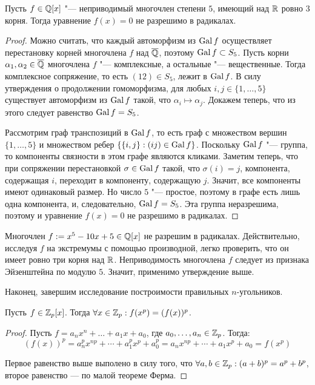 \begin{corollary}
	Пусть $f \in \mathbb{Q}[x]$ "--- неприводимый многочлен степени $5$, имеющий над $\mathbb{R}$ ровно $3$ корня. Тогда уравнение $f(x) = 0$ не разрешимо в радикалах.
\end{corollary}

\begin{proof}
	Можно считать, что каждый автоморфизм из $\operatorname{Gal}{f}$ осуществляет перестановку корней многочлена $f$ над $\overline{\mathbb{Q}}$, поэтому $\operatorname{Gal}{f} \subset S_5$. Пусть корни $\alpha_1, \alpha_2 \in \overline{\mathbb{Q}}$ многочлена $f$ "--- комплексные, а остальные "--- вещественные. Тогда комплексное сопряжение, то есть $(12) \in S_5$, лежит в $\operatorname{Gal}{f}$. В силу утверждения о продолжении гомоморфизма, для любых $i, j \in \{1, \dotsc, 5\}$ существует автоморфизм из $\operatorname{Gal}{f}$ такой, что $\alpha_i \mapsto \alpha_j$. Докажем теперь, что из этого следует равенство $\operatorname{Gal}{f} = S_5$.
	
	Рассмотрим граф транспозиций в $\operatorname{Gal}{f}$, то есть граф с множеством вершин $\{1, \dotsc, 5\}$ и множеством ребер $\{\{i, j\} : (ij) \in \operatorname{Gal}{f}\}$. Поскольку $\operatorname{Gal}{f}$ "--- группа, то компоненты связности в этом графе являются кликами. Заметим теперь, что при сопряжении перестановкой $\sigma \in \operatorname{Gal}{f}$ такой, что $\sigma(i) = j$, компонента, содержащая $i$, переходит в компоненту, содержащую $j$. Значит, все компоненты имеют одинаковый размер. Но число $5$ "--- простое, поэтому в графе есть лишь одна компонента, и, следовательно, $\operatorname{Gal}{f} = S_5$. Эта группа неразрешима, поэтому и уравнение $f(x) = 0$ не разрешимо в радикалах.
\end{proof}

\begin{example}
	Многочлен $f := x^5 - 10x + 5 \in \mathbb{Q}[x]$ не разрешим в радикалах. Действительно, исследуя $f$ на экстремумы с помощью производной, легко проверить, что он имеет ровно три корня над $\mathbb{R}$. Неприводимость многочлена $f$ следует из признака Эйзенштейна по модулю $5$. Значит, применимо утверждение выше.
\end{example}

Наконец, завершим исследование построимости правильных $n$-угольников.

\begin{proposition}
	Пусть $f \in \mathbb{Z}_p[x]$. Тогда $\forall x \in \mathbb{Z}_p: f(x^p) = (f(x))^p$.
\end{proposition}

\begin{proof}
	Пусть $f = a_nx^n + \dotsc + a_1x + a_0$, где $a_0, \dotsc, a_n \in \mathbb{Z}_p$. Тогда:
	\[(f(x))^p = a_n^px^{np} + \dotsb + a_1^px^p + a_0^p = a_nx^{np} + \dotsb + a_1x^p + a_0 = f(x^p)\]
	
	Первое равенство выше выполено в силу того, что $\forall a, b \in \mathbb{Z}_p: (a + b)^p = a^p + b^p$, второе равенство --- по малой теореме Ферма.
\end{proof}

